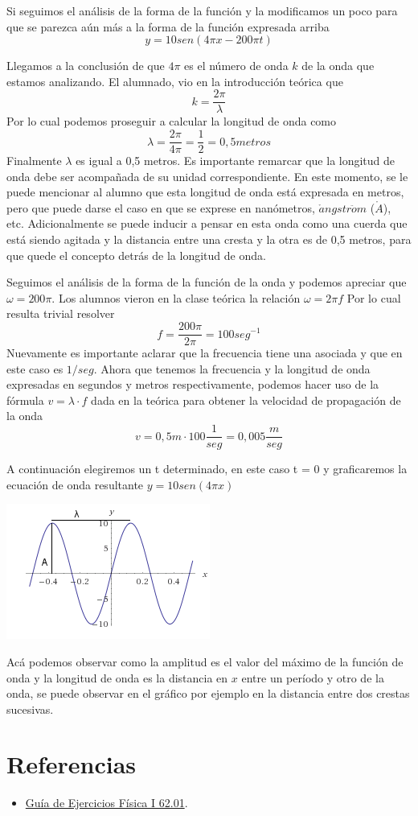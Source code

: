 \documentclass[spanish] {article}
\begin{document}
Si seguimos el análisis de la forma de la función y la modificamos un poco para que se parezca aún más a la forma de la función expresada arriba
$$y = 10 sen  (4 \pi x- 200 \pi t)$$

Llegamos a la conclusión de que $4 \pi$ es el número de onda $k$ de la onda que estamos analizando. El alumnado, vio en la introducción teórica que 
$$ k = \frac{2\pi}{\lambda}$$
Por lo cual podemos proseguir a calcular la longitud de onda como
$$ \lambda = \frac{2\pi}{4\pi} = \frac{1}{2} = 0,5 metros$$ 
Finalmente $\lambda$ es igual a 0,5 metros. Es importante remarcar que la longitud de onda debe ser acompañada de su unidad correspondiente. En este momento, se le puede mencionar al alumno que esta longitud de onda está expresada en metros, pero que puede darse el caso en que se exprese en nanómetros, $\mathring{a}ngstr\ddot{o}m$ ($\mathring{A}$), etc.
Adicionalmente se puede inducir a pensar en esta onda como una cuerda que está siendo agitada y la distancia entre una cresta y la otra es de 0,5 metros, para que quede el concepto detrás de la longitud de onda.

Seguimos el análisis de la forma de la función de la onda y podemos apreciar que $ \omega = 200 \pi $. Los alumnos vieron en la clase teórica la relación $ \omega = 2 \pi f $
Por lo cual resulta trivial resolver
$$ f = \frac{200 \pi}{2 \pi} = 100 seg^{-1}$$
Nuevamente es importante aclarar que la frecuencia tiene una asociada y que en este caso es $1/seg$.
Ahora que tenemos la frecuencia y la longitud de onda expresadas en segundos y metros respectivamente, podemos hacer uso de la fórmula $v = \lambda \cdot f$ dada en la teórica para obtener la velocidad de propagación de la onda
$$v = 0,5m \cdot 100 \frac{1}{seg} = 0,005 \frac{m}{seg}$$

A continuación elegiremos un t determinado, en este caso t = 0 y graficaremos la ecuación de onda resultante $y=10 sen(4 \pi x)$

\includegraphics{plot2}

Acá podemos observar como la amplitud es el valor del máximo de la función de onda y la longitud de onda es la distancia en $x$ entre un período y otro de la onda, se puede observar en el gráfico por ejemplo en la distancia entre dos crestas sucesivas.

\section{Referencias}

\begin{itemize}
  \item \href{http://wiki.foros-fiuba.com.ar/_media/materias:62:guia_fisica_i_62.01.pdf}{Guía de Ejercicios Física I 62.01}.
\end{itemize}
\end{document}
